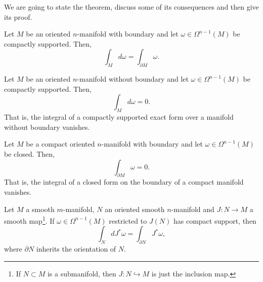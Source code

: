 We are going to state the theorem, discuss some of its consequences and then give its proof.

\begin{theorem}\label{thm:Stokes}
	Let $M$ be an oriented $n$-manifold with boundary and let $\omega\in\Omega^{n-1}(M)$ be compactly supported.
	Then,
	\begin{equation}\label{eq:Stokes}
		\int_M d\omega = \int_{\partial M} \omega.
	\end{equation}
\end{theorem}

\begin{corollary}
	Let $M$ be an oriented $n$-manifold without boundary and let $\omega\in\Omega^{n-1}(M)$ be compactly supported.
	Then,
	\begin{equation}
		\int_M d\omega = 0.
	\end{equation}
	That is, the integral of a compactly supported exact form over a manifold without boundary vanishes.
\end{corollary}

\begin{corollary}
	Let $M$ be a compact oriented $n$-manifold with boundary and let $\omega\in\Omega^{n-1}(M)$ be closed.
	Then,
	\begin{equation}
		\int_{\partial M} \omega = 0.
	\end{equation}
	That is, the integral of a closed form on the boundary of a compact manifold vanishes.
\end{corollary}

\begin{corollary}
	Let $M$ a smooth $m$-manifold, $N$ an oriented smooth $n$-manifold and $J:N\to M$ a smooth map\footnote{If $N\subset M$ is a submanifold, then $J:N\hookrightarrow M$ is just the inclusion map.}.
	If $\omega\in\Omega^{n-1}(M)$ restricted to $J(N)$ has compact support, then
	\begin{equation}
		\int_{N} d J^*\omega = \int_{\partial N} J^*\omega,
	\end{equation}
	where $\partial N$ inherits the orientation of $N$.
\end{corollary}

